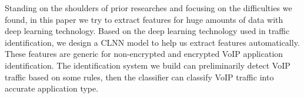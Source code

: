 \documentclass[conference]{IEEEtran}
\begin{document}



Standing on the shoulders of prior researches and focusing on the difficulties we found, in this paper we try to extract features for huge amounts of data with deep learning technology. Based on the deep learning technology used in traffic identification\cite{1,wang2017end}, we design a CLNN model to help us extract features automatically. These features are generic for non-encrypted and encrypted VoIP application identification. The identification system we build can preliminarily detect VoIP traffic based on some rules, then the classifier can classify VoIP traffic into accurate application type.
\end{document}
